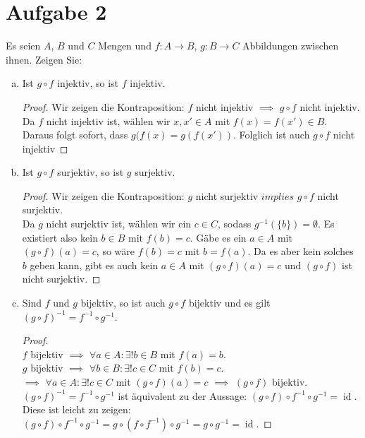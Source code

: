 \documentclass{article}
\begin{document}
	\section*{Aufgabe 2}
	Es seien $A$, $B$ und $C$ Mengen und $f : A \to B$, $g : B \to C$ Abbildungen
	zwischen ihnen. Zeigen Sie:
	\begin{enumerate}[a)]
		\item Ist $g\circ f$ injektiv, so ist $f$ injektiv.
		\begin{proof}
			Wir zeigen die Kontraposition: $f$ nicht injektiv $\implies$ $g\circ f$ nicht injektiv.\\
			Da $f$ nicht injektiv ist, wählen wir $x, x' \in A$ mit $f(x) = f(x') \in B$.
			Daraus folgt sofort, dass $g(f(x) = g(f(x'))$. Folglich ist auch $g\circ f$ nicht injektiv
		\end{proof}
		\item Ist $g\circ f$ surjektiv, so ist $g$ surjektiv.
		\begin{proof}
			Wir zeigen die Kontraposition: $g$ nicht surjektiv $implies$ $g\circ f$ nicht surjektiv.\\
			Da $g$ nicht surjektiv ist, wählen wir ein $c\in C$, sodass $g^{-1}(\{b\}) = \emptyset$. Es existiert also kein $b \in B$ mit $f(b) = c$.
			Gäbe es ein $a\in A$ mit $(g\circ f)(a) = c$, so wäre $f(b) = c$ mit $b = f(a)$. Da es aber kein solches $b$ geben kann, gibt es auch kein $a \in A$ mit $(g\circ f)(a) = c$ und $(g\circ f)$ ist nicht surjektiv.
		\end{proof}
		\item Sind $f$ und $g$ bijektiv, so ist auch $g\circ f$ bijektiv und es gilt $(g\circ f)^{-1} = f^{-1}\circ g^{-1}$.
		\begin{proof}\ \\
			$f$ bijektiv $\implies$ $\forall a \in A:\exists! b\in B$ mit $f(a) = b$.\\
			$g$ bijektiv $\implies$ $\forall b \in B:\exists! c\in C$ mit $f(b) = c$.\\
			$\implies$ $\forall a \in A: \exists! c\in C$ mit $(g\circ f)(a) = c$ $\implies$ $(g\circ f)$ bijektiv.\\
			$(g\circ f)^{-1} = f^{-1}\circ g^{-1}$ ist äquivalent zu der Aussage: $(g\circ f)\circ f^{-1}\circ g^{-1} = \operatorname{id}$.
			Diese ist leicht zu zeigen: $(g\circ f)\circ f^{-1}\circ g^{-1} = g \circ (f\circ f^{-1}) \circ g^{-1} = g\circ g^{-1} = \operatorname{id}$.
		\end{proof}
	\end{enumerate}
\end{document}
